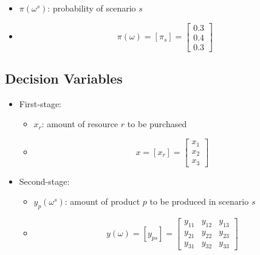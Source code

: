 \documentclass[8pt]{article}
\begin{document}
\begin{itemize}
\[\begin{bmatrix}
                  20  & 110 & 250 \\
                  200 & 225 & 500
              \end{bmatrix}
          \]
    \item $\pi(\omega^s)$: probability of scenario $s$
    \item[]
          \[
              \pi(\omega) = [\pi_{s}] =
              \begin{bmatrix}
                  0.3 \\
                  0.4 \\
                  0.3
              \end{bmatrix}
          \]
\end{itemize}

\subsection*{Decision Variables}
\begin{itemize}
    \item First-stage:
          \begin{itemize}
              \item[$\circ$] $x_r$: amount of resource $r$ to be purchased
              \item[]
                    \[
                        x = [x_{r}] =
                        \begin{bmatrix}
                            x_1 \\
                            x_2 \\
                            x_3
                        \end{bmatrix}
                    \]
          \end{itemize}
    \item Second-stage:
          \begin{itemize}
              \item[$\circ$] $y_{p}(\omega^s)$: amount of product $p$ to be produced in scenario $s$
              \item[]
                    \[
                        y(\omega) = [y_{ps}] =
                        \begin{bmatrix}
                            y_{11} & y_{12} & y_{13} \\
                            y_{21} & y_{22} & y_{23} \\
                            y_{31} & y_{32} & y_{33}
                        \end{bmatrix}
                    \]
          \end{itemize}
\end{itemize}
\end{document}

